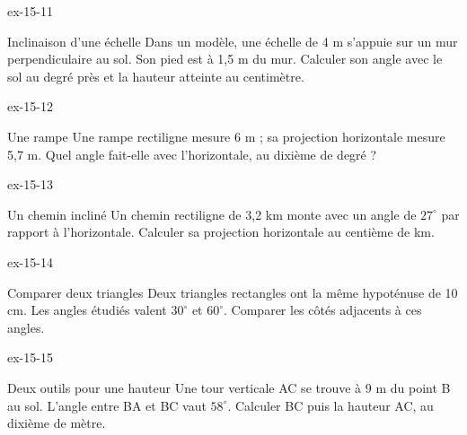\begin{blocLivre}{ex-15-11}\begin{exercice}[3]{Inclinaison d’une échelle}
Dans un modèle, une échelle de 4 m s’appuie sur un mur perpendiculaire au sol. Son pied est à 1,5 m du mur. Calculer son angle avec le sol au degré près et la hauteur atteinte au centimètre.
\label{fig-ex-15-11}
\end{exercice}\end{blocLivre}
\begin{blocLivre}{ex-15-12}\begin{exercice}[3]{Une rampe}
Une rampe rectiligne mesure 6 m ; sa projection horizontale mesure 5,7 m. Quel angle fait-elle avec l’horizontale, au dixième de degré ?
\label{fig-ex-15-12}
\end{exercice}\end{blocLivre}
\begin{blocLivre}{ex-15-13}\begin{exercice}[3]{Un chemin incliné}
Un chemin rectiligne de 3,2 km monte avec un angle de $27^\circ$ par rapport à l’horizontale. Calculer sa projection horizontale au centième de km.
\label{fig-ex-15-13}
\end{exercice}\end{blocLivre}
\begin{blocLivre}{ex-15-14}\begin{exercice}[3]{Comparer deux triangles}
Deux triangles rectangles ont la même hypoténuse de 10 cm. Les angles étudiés valent $30^\circ$ et $60^\circ$. Comparer les côtés adjacents à ces angles.
\label{fig-ex-15-14}
\end{exercice}\end{blocLivre}
\begin{blocLivre}{ex-15-15}\begin{exercice}[3]{Deux outils pour une hauteur}
Une tour verticale AC se trouve à 9 m du point B au sol. L’angle entre BA et BC vaut $58^\circ$. Calculer BC puis la hauteur AC, au dixième de mètre.
\label{fig-ex-15-15}
\end{exercice}\end{blocLivre}

\clearpage

